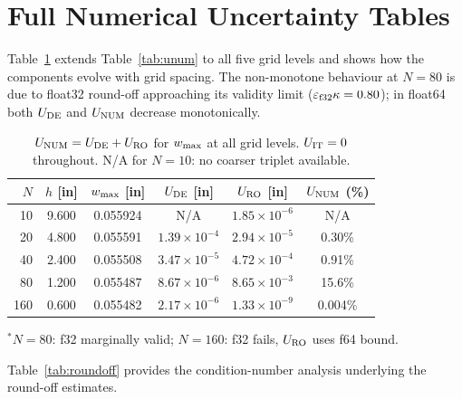\documentclass[10pt,twocolumn]{article}
\begin{document}
\section{Full Numerical Uncertainty Tables}
\label{app:unum}

Table~\ref{tab:unum_all} extends Table~\ref{tab:unum} to all five grid levels
and shows how the components evolve with grid spacing.
The non-monotone behaviour at $N=80$ is due to float32 round-off approaching
its validity limit ($\varepsilon_{\rm f32}\kappa=0.80$); in float64 both
$U_{\rm DE}$ and $U_{\rm NUM}$ decrease monotonically.

\begin{table}[h!]
\centering
\caption{$U_{\rm NUM}=U_{\rm DE}+U_{\rm RO}$ for $w_{\rm max}$ at all grid levels.
  $U_{\rm IT}=0$ throughout.  N/A for $N=10$: no coarser triplet available.}
\label{tab:unum_all}
\footnotesize
\setlength{\tabcolsep}{4pt}
\begin{tabular}{@{}rccccc@{}}
\toprule
$N$ & $h$ [in] & $w_{\rm max}$ [in] & $U_{\rm DE}$ [in] & $U_{\rm RO}$ [in] & $U_{\rm NUM}$ (\%)\\
\midrule
 10 & 9.600 & 0.055924 & N/A & $1.85{\times}10^{-6}$ & N/A\\
 20 & 4.800 & 0.055591 & $1.39{\times}10^{-4}$ & $2.94{\times}10^{-5}$ & 0.30\%\\
 40 & 2.400 & 0.055508 & $3.47{\times}10^{-5}$ & $4.72{\times}10^{-4}$ & 0.91\%\\
 80 & 1.200 & 0.055487 & $8.67{\times}10^{-6}$ & $8.65{\times}10^{-3}$ & 15.6\%\\
160 & 0.600 & 0.055482 & $2.17{\times}10^{-6}$ & $1.33{\times}10^{-9}$ & 0.004\%\\
\bottomrule
\end{tabular}
{\footnotesize $^*N{=}80$: f32 marginally valid; $N{=}160$: f32 fails, $U_{\rm RO}$ uses f64 bound.}
\end{table}

Table~\ref{tab:roundoff} provides the condition-number analysis underlying
the round-off estimates.
\end{document}
